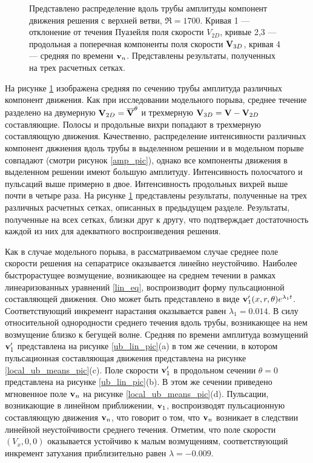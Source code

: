 \begin{figure}
\caption{Представлено распределение вдоль трубы амплитуды компонент движения решения с верхней ветви, $\Re = 1700$. Кривая 1 --- отклонение от течения Пуазейля поля скорости $V_{2D}$, кривые 2,3 --- продольная а поперечная компоненты поля скорости $\mathbf{V}_{3D}$, кривая 4 --- средняя по времени $\mathbf{v}_n$. Представлены результаты, полученных на трех расчетных сетках.}
\label{amp_ub_pic}
\end{figure}


На рисунке \ref{amp_ub_pic} изображена средняя по сечению трубы амплитуда различных компонент движения. Как при исследовании модельного порыва, среднее течение разделено на двумерную $\mathbf{V}_{2D} = \overline{\mathbf{V}}^{\theta}$ и трехмерную $\mathbf{V}_{3D} = \mathbf{V} - \mathbf{V}_{2D}$ составляющие. Полосы и продольные вихри попадают в трехмерную составляющую движения. Качественно, распределение интенсивности различных компонент двжиения вдоль трубы в выделенном решении и в модельном порыве совпадают (смотри рисунок \ref{amp_pic}), однако все компоненты движения в выделенном решении имеют большую амплитуду. Интенсивность полосчатого и пульсаций выше примерно в двое. Интенсивность продольных вихрей выше почти в четыре раза. На рисунке \ref{amp_ub_pic} представлены результаты, полученные на трех различных расчетных сетках, описанных в предыдущем разделе. Результаты, полученные на всех сетках, близки друг к другу, что подтверждает достаточность каждой из них для адекватного воспроизведения решения. 



Как в случае модельного порыва, в рассматриваемом случае среднее поле скорости решения на сепаратрисе оказывается линейно неустойчиво. Наиболее быстрорастущее возмущение, возникающее на среднем течении в рамках линеаризованных уравнений \eqref{lin_eq}, воспроизводит форму пульсационной составляющей движения. Оно может быть представлено в виде $\mathbf{v}'_1(x,r,\theta) e^{\lambda_1 t}$. Соответствующий инкремент нарастания оказывается равен $\lambda_1 = 0.014$. В силу относительной однородности среднего течения вдоль трубы, возникающее на нем возмущение близко к бегущей волне. Средняя по времени амплитуда возмущений $\mathbf{v}'_1$ представлена на рисунке \ref{ub_lin_pic}(a) в том же сечении, в котором пульсационная составляющая движения представлена на рисунке \ref{local_ub_means_pic}(c). Поле скорости $\mathbf{v}'_1$ в продольном сечении $\theta = 0$ представлена на рисунке \ref{ub_lin_pic}(b). В этом же сечении приведено мгновенное поле $\mathbf{v}_n$ на рисунке \ref{local_ub_means_pic}(d). Пульсации, возникающие в линейном приближении, $\mathbf{v}_1$, воспроизводят пульсационную составляющую движения $\mathbf{v}_n$, что говорит о том, что $\mathbf{v}_n$ возникает в следствии линейной неустойчивости среднего течения. Отметим, что поле скорости $(V_x, 0, 0)$ оказывается устойчиво к малым возмущениям, соответствующий инкремент затухания приблизительно равен $\lambda = -0.009$. 


